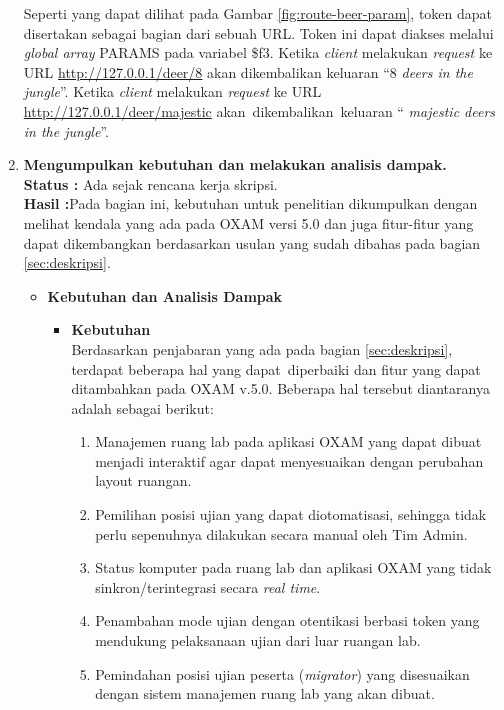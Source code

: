 \documentclass[a4paper,twoside]{article}
\begin{document}
\begin{enumerate}
        Seperti yang dapat dilihat pada Gambar \ref{fig:route-beer-param}, token dapat disertakan sebagai bagian dari sebuah URL. Token ini dapat diakses melalui \textit{global array} PARAMS pada variabel \$f3. Ketika \textit{client} melakukan \textit{request} ke URL \url{http://127.0.0.1/deer/8} akan dikembalikan keluaran ``8 \textit{deers in the jungle}''. Ketika \textit{client} melakukan \textit{request} ke URL \url{http://127.0.0.1/deer/majestic} akan~dikembalikan~keluaran `` \textit{majestic deers in the jungle}''.
        
		\item \textbf{Mengumpulkan kebutuhan dan melakukan analisis dampak.}\\
		{\bf Status :} Ada sejak rencana kerja skripsi.\\
		{\bf Hasil :}Pada bagian ini, kebutuhan untuk penelitian dikumpulkan dengan melihat kendala yang ada pada OXAM versi 5.0 dan juga fitur-fitur yang dapat dikembangkan berdasarkan usulan yang sudah dibahas pada bagian \ref{sec:deskripsi}.
		
		\begin{itemize}
		    \item \textbf{Kebutuhan dan Analisis Dampak}\\
		    \label{kebutuhan_analisis-dampak}
		     \begin{itemize}
		         \item \textbf{Kebutuhan}\\
		         \label{kebutuhan}
		         \setlength\parindent{0pt}
		         Berdasarkan penjabaran yang ada pada bagian \ref{sec:deskripsi}, terdapat beberapa hal yang dapat~diperbaiki dan fitur yang dapat ditambahkan pada OXAM v.5.0. Beberapa hal tersebut diantaranya adalah sebagai berikut:
		
            		\begin{enumerate}
            		    \item Manajemen ruang lab pada aplikasi OXAM yang dapat dibuat menjadi interaktif agar dapat menyesuaikan dengan perubahan layout ruangan.
            		    \item Pemilihan posisi ujian yang dapat diotomatisasi, sehingga tidak perlu sepenuhnya dilakukan secara manual oleh Tim Admin.
            		    \item Status komputer pada ruang lab dan aplikasi OXAM yang tidak sinkron/terintegrasi secara \textit{real time}.
            		    \item Penambahan mode ujian dengan otentikasi berbasi token yang mendukung pelaksanaan ujian dari luar ruangan lab.
            		    \item Pemindahan posisi ujian peserta (\textit{migrator}) yang disesuaikan dengan sistem manajemen ruang lab yang akan dibuat.
            		\end{enumerate}
            		

\end{itemize}
\end{itemize}
\end{enumerate}
\end{document}
